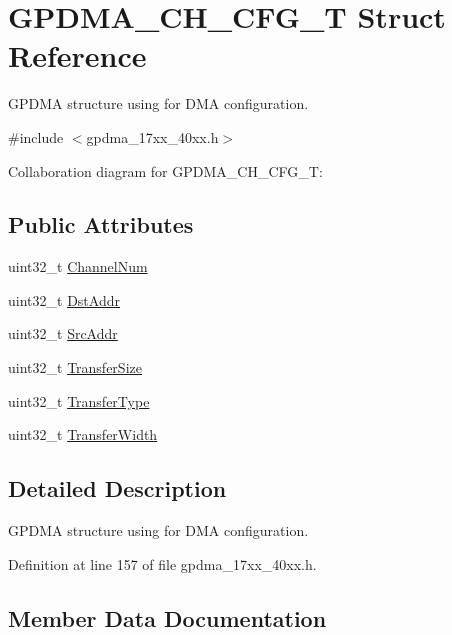 \hypertarget{structGPDMA__CH__CFG__T}{}\section{G\+P\+D\+M\+A\+\_\+\+C\+H\+\_\+\+C\+F\+G\+\_\+T Struct Reference}
\label{structGPDMA__CH__CFG__T}


G\+P\+D\+MA structure using for D\+MA configuration.  




{\ttfamily \#include $<$gpdma\+\_\+17xx\+\_\+40xx.\+h$>$}



Collaboration diagram for G\+P\+D\+M\+A\+\_\+\+C\+H\+\_\+\+C\+F\+G\+\_\+T\+:
\subsection*{Public Attributes}
\begin{DoxyCompactItemize}
\item 
uint32\+\_\+t \hyperlink{structGPDMA__CH__CFG__T_a9a37cb463108848cc37e79d230f34602}{Channel\+Num}
\item 
uint32\+\_\+t \hyperlink{structGPDMA__CH__CFG__T_a6e67f866c02d9a27662c798bac0554b8}{Dst\+Addr}
\item 
uint32\+\_\+t \hyperlink{structGPDMA__CH__CFG__T_a53adde93dea1ba4ce81af0fd4bd3e66e}{Src\+Addr}
\item 
uint32\+\_\+t \hyperlink{structGPDMA__CH__CFG__T_a5666efb9edb055974b590443ea45ed7b}{Transfer\+Size}
\item 
uint32\+\_\+t \hyperlink{structGPDMA__CH__CFG__T_a6c21f3fe48e5e23443a324f9a42a3886}{Transfer\+Type}
\item 
uint32\+\_\+t \hyperlink{structGPDMA__CH__CFG__T_a7aff974420b56393365cc335015ba8df}{Transfer\+Width}
\end{DoxyCompactItemize}


\subsection{Detailed Description}
G\+P\+D\+MA structure using for D\+MA configuration. 

Definition at line 157 of file gpdma\+\_\+17xx\+\_\+40xx.\+h.



\subsection{Member Data Documentation}
